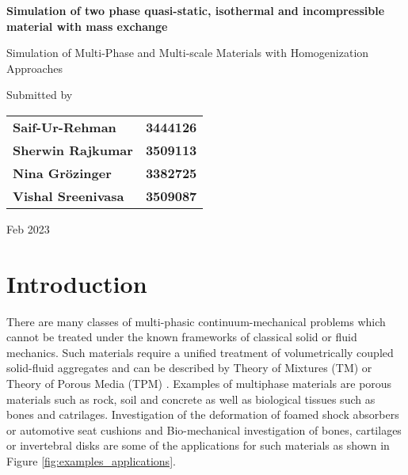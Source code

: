 \documentclass[12pt]{article}
\begin{document}
\begin{titlepage} 
   \begin{center}
       \vspace*{2cm}

       \doublespacing
       \textbf{\Huge{Simulation of two phase quasi-static, isothermal and incompressible material with mass exchange}}
       

        \vspace{1cm}
        
        \Large{Simulation of Multi-Phase and Multi-scale Materials with Homogenization Approaches}
            
       \vspace{2.5cm}
       
       \Large{Submitted by }
        \begin{center}
         
            \begin{tabular}{ l c } 
            \textbf{Saif-Ur-Rehman} & \textbf{3444126}  \\ 
            \textbf{Sherwin Rajkumar} & \textbf{3509113}  \\
            \textbf{Nina Grözinger} & \textbf{3382725}  \\
            \textbf{Vishal Sreenivasa} & \textbf{3509087}  \\
            \end{tabular}

            
        \end{center}
       \vspace{5cm}
       
       \Large{Feb 2023}
            
        
   \end{center}
\end{titlepage}

\tableofcontents
\newpage

\section*{\huge{Introduction}}
\vspace{1cm}
There are many classes of multi-phasic continuum-mechanical problems which cannot be treated under the known frameworks of classical solid or fluid mechanics. Such materials require a unified treatment of volumetrically coupled solid-fluid aggregates and can be described by Theory of Mixtures (TM) or Theory of Porous Media (TPM) \cite{deBoer2000}. Examples of multiphase materials are porous materials such as rock, soil and concrete as well as biological tissues such as bones and catrilages. Investigation of the deformation of foamed shock absorbers or automotive seat cushions and Bio-mechanical investigation of bones, cartilages or invertebral disks are some of the applications for such materials as shown in Figure \ref{fig:examples_applications}.
\par
\end{document}
